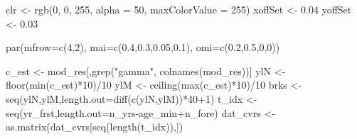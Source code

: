 \documentclass[11pt,]{article}
\newenvironment{Shaded}{}{}
\newcommand{\KeywordTok}[1]{\textcolor[rgb]{0.00,0.00,1.00}{#1}}
\newcommand{\DataTypeTok}[1]{#1}
\newcommand{\DecValTok}[1]{#1}
\newcommand{\FloatTok}[1]{#1}
\newcommand{\StringTok}[1]{\textcolor[rgb]{0.00,0.50,0.50}{#1}}
\newcommand{\OperatorTok}[1]{#1}
\newcommand{\NormalTok}[1]{#1}
\begin{document}
\begin{Shaded}
\begin{Highlighting}[]
\NormalTok{clr <-}\StringTok{ }\KeywordTok{rgb}\NormalTok{(}\DecValTok{0}\NormalTok{, }\DecValTok{0}\NormalTok{, }\DecValTok{255}\NormalTok{, }\DataTypeTok{alpha =} \DecValTok{50}\NormalTok{, }\DataTypeTok{maxColorValue =} \DecValTok{255}\NormalTok{)}
\NormalTok{xoffSet <-}\StringTok{ }\FloatTok{0.04}
\NormalTok{yoffSet <-}\StringTok{ }\FloatTok{0.03}


\KeywordTok{par}\NormalTok{(}\DataTypeTok{mfrow=}\KeywordTok{c}\NormalTok{(}\DecValTok{4}\NormalTok{,}\DecValTok{2}\NormalTok{), }\DataTypeTok{mai=}\KeywordTok{c}\NormalTok{(}\FloatTok{0.4}\NormalTok{,}\FloatTok{0.3}\NormalTok{,}\FloatTok{0.05}\NormalTok{,}\FloatTok{0.1}\NormalTok{), }\DataTypeTok{omi=}\KeywordTok{c}\NormalTok{(}\FloatTok{0.2}\NormalTok{,}\FloatTok{0.5}\NormalTok{,}\DecValTok{0}\NormalTok{,}\DecValTok{0}\NormalTok{))}

\NormalTok{c_est <-}\StringTok{ }\NormalTok{mod_res[,}\KeywordTok{grep}\NormalTok{(}\StringTok{"gamma"}\NormalTok{, }\KeywordTok{colnames}\NormalTok{(mod_res))]}
\NormalTok{ylN <-}\StringTok{ }\KeywordTok{floor}\NormalTok{(}\KeywordTok{min}\NormalTok{(c_est)}\OperatorTok{*}\DecValTok{10}\NormalTok{)}\OperatorTok{/}\DecValTok{10}
\NormalTok{ylM <-}\StringTok{ }\KeywordTok{ceiling}\NormalTok{(}\KeywordTok{max}\NormalTok{(c_est)}\OperatorTok{*}\DecValTok{10}\NormalTok{)}\OperatorTok{/}\DecValTok{10}
\NormalTok{brks <-}\StringTok{ }\KeywordTok{seq}\NormalTok{(ylN,ylM,}\DataTypeTok{length.out=}\KeywordTok{diff}\NormalTok{(}\KeywordTok{c}\NormalTok{(ylN,ylM))}\OperatorTok{*}\DecValTok{40}\OperatorTok{+}\DecValTok{1}\NormalTok{)}
\NormalTok{t_idx <-}\StringTok{ }\KeywordTok{seq}\NormalTok{(yr_frst,}\DataTypeTok{length.out=}\NormalTok{n_yrs}\OperatorTok{-}\NormalTok{age_min}\OperatorTok{+}\NormalTok{n_fore)}
\NormalTok{dat_cvrs <-}\StringTok{ }\KeywordTok{as.matrix}\NormalTok{(dat_cvrs[}\KeywordTok{seq}\NormalTok{(}\KeywordTok{length}\NormalTok{(t_idx)),])}


\end{Highlighting}
\end{Shaded}
\end{document}
